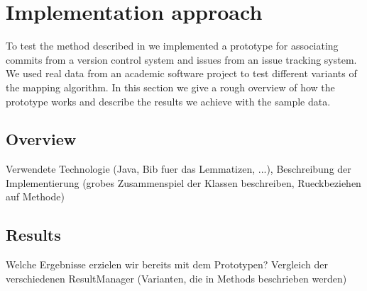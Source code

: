 \section{Implementation approach}
\label{sec:implementation_approach}
To test the method described in  we implemented a prototype for associating commits from a version control system and issues from an issue tracking system.
We used real data from an academic software project to test different variants of the mapping algorithm.
In this section we give a rough overview of how the prototype works and describe the results we achieve with the sample data.

\subsection{Overview} 
Verwendete Technologie (Java, Bib fuer das Lemmatizen, ...),
Beschreibung der Implementierung (grobes Zusammenspiel der Klassen beschreiben, Rueckbeziehen auf Methode)

\subsection{Results}
Welche Ergebnisse erzielen wir bereits mit dem Prototypen?
Vergleich der verschiedenen ResultManager (Varianten, die in Methods beschrieben werden)